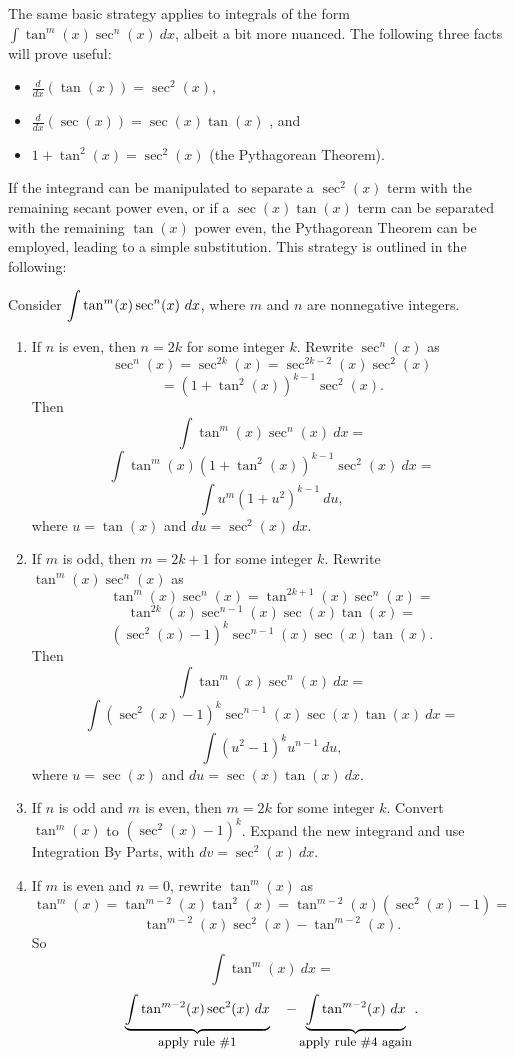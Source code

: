 The same basic strategy applies to integrals of the form \newline $\int \tan^m(x)\sec^n(x)\ dx$, albeit a bit more nuanced. The following three facts will prove useful:
\begin{itemize}
\item $\frac{d}{dx}(\tan(x)) = \sec^2(x)$, 
\item $\frac{d}{dx}(\sec(x)) = \sec(x)\tan(x)$ , and 
\item	$1+\tan^2(x) = \sec^2(x)$ (the Pythagorean Theorem).
\end{itemize}

If the integrand can be manipulated to separate a $\sec^2(x)$ term with the remaining secant power even, or if a $\sec(x)\tan(x)$ term can be separated with the remaining $\tan(x)$ power even, the Pythagorean Theorem can be employed, leading to a simple substitution. This strategy is outlined in the following:

{Consider $\ds\int\tan^m(x)\sec^n(x)\ dx$, where $m$ and $n$ are nonnegative integers.
\begin{enumerate}[1)]
\item If $n$ is even, then $n=2k$ for some integer $k$. Rewrite $\sec^n(x)$ as 
$$\sec^n(x) = \sec^{2k}(x) = \sec^{2k-2}(x)\sec^2(x)$$
$$ = (1+\tan^2(x))^{k-1}\sec^2(x).$$
Then
$$\int\tan^m(x)\sec^n(x)\ dx=$$
$$\int\tan^m(x)(1+\tan^2(x))^{k-1}\sec^2(x)\ dx =$$
$$ \int u^m(1+u^2)^{k-1}\ du,$$
where $u = \tan(x)$ and $du = \sec^2(x)\ dx$.

\item If $m$ is odd, then $m=2k+1$ for some integer $k$. Rewrite $\tan^m(x)\sec^n(x)$ as
$$\tan^m(x)\sec^n(x) = \tan^{2k+1}(x)\sec^n(x) = $$
$$\tan^{2k}(x)\sec^{n-1}(x)\sec(x)\tan(x) = $$
$$(\sec^2(x)-1)^k\sec^{n-1}(x)\sec(x)\tan(x).$$
Then
$$\int\tan^m(x)\sec^n(x)\ dx=$$
$$\int(\sec^2(x)-1)^k\sec^{n-1}(x)\sec(x)\tan(x)\ dx = $$
$$\int(u^2-1)^ku^{n-1}\ du,$$
where $u = \sec(x)$ and $du = \sec(x)\tan(x)\ dx$.

\item If $n$ is odd and $m$ is even, then $m=2k$ for some integer $k$. Convert $\tan^m(x) $ to $(\sec^2(x)-1)^k$. Expand the new integrand and use Integration By Parts, with $dv = \sec^2(x)\ dx$.

\item If $m$ is even and $n=0$, rewrite $\tan^m(x)$ as
$$\tan^m(x) = \tan^{m-2}(x)\tan^2(x) = \tan^{m-2}(x)(\sec^2(x)-1) = $$
$$\tan^{m-2}(x)\sec^2(x)-\tan^{m-2}(x).$$
So
$$\int\tan^m(x)\ dx = $$
$$\underbrace{\int\tan^{m-2}(x)\sec^2(x)\ dx}_{\text{\small apply rule \#1}}\quad - \underbrace{\int\tan^{m-2}(x)\ dx}_{\text{\small apply rule \#4 again}}.$$

\end{enumerate}
} %

